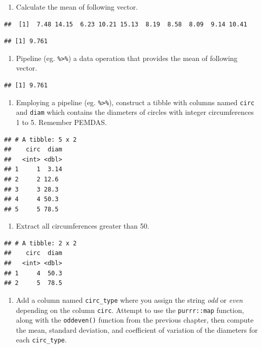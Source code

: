 \documentclass[
]{book}
\providecommand{\tightlist}{%
  \setlength{\itemsep}{0pt}\setlength{\parskip}{0pt}}
\begin{document}
\begin{enumerate}
\def\labelenumi{\arabic{enumi}.}
\tightlist
\item
  Calculate the mean of following vector.
\end{enumerate}

\begin{verbatim}
##  [1]  7.48 14.15  6.23 10.21 15.13  8.19  8.58  8.09  9.14 10.41
\end{verbatim}

\begin{verbatim}
## [1] 9.761
\end{verbatim}

\begin{enumerate}
\def\labelenumi{\arabic{enumi}.}
\setcounter{enumi}{1}
\tightlist
\item
  Pipeline (eg. \texttt{\%\textgreater{}\%}) a data operation that provides the mean of following vector.
\end{enumerate}

\begin{verbatim}
## [1] 9.761
\end{verbatim}

\begin{enumerate}
\def\labelenumi{\arabic{enumi}.}
\setcounter{enumi}{1}
\tightlist
\item
  Employing a pipeline (eg. \texttt{\%\textgreater{}\%}), construct a tibble with columns named \texttt{circ} and \texttt{diam} which contains the diameters of circles with integer circumferences 1 to 5. Remember PEMDAS.
\end{enumerate}

\begin{verbatim}
## # A tibble: 5 x 2
##    circ  diam
##   <int> <dbl>
## 1     1  3.14
## 2     2 12.6 
## 3     3 28.3 
## 4     4 50.3 
## 5     5 78.5
\end{verbatim}

\begin{enumerate}
\def\labelenumi{\arabic{enumi}.}
\setcounter{enumi}{2}
\tightlist
\item
  Extract all circumferences greater than 50.
\end{enumerate}

\begin{verbatim}
## # A tibble: 2 x 2
##    circ  diam
##   <int> <dbl>
## 1     4  50.3
## 2     5  78.5
\end{verbatim}

\begin{enumerate}
\def\labelenumi{\arabic{enumi}.}
\setcounter{enumi}{3}
\tightlist
\item
  Add a column named \texttt{circ\_type} where you assign the string \emph{odd} or \emph{even} depending on the column \texttt{circ}. Attempt to use the \texttt{purrr::map} function, along with the \texttt{oddeven()} function from the previous chapter, then compute the mean, standard deviation, and coefficient of variation of the diameters for each \texttt{circ\_type}.
\end{enumerate}
\end{document}
